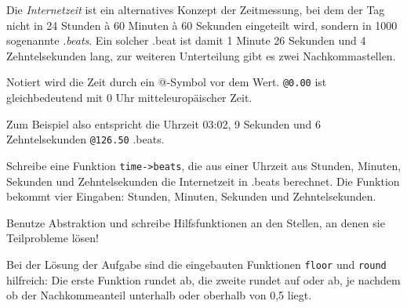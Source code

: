 \begin{aufgabe} Die \textit{Internetzeit} ist ein alternatives Konzept
  der Zeitmessung, bei dem der Tag nicht in 24 Stunden \`a 60 Minuten
  \`a 60 Sekunden eingeteilt wird, sondern in 1000 sogenannte
  \textit{.beats}.  Ein solcher .beat ist damit 1 Minute 26 Sekunden
  und 4 Zehntelsekunden lang, zur weiteren Unterteilung gibt es zwei
  Nachkommastellen.

  Notiert wird die Zeit durch ein @-Symbol vor dem Wert.
  \texttt{@0.00} ist gleichbedeutend mit 0 Uhr mitteleuropäischer Zeit.

  Zum Beispiel also entspricht die Uhrzeit 03:02, 9 Sekunden und 6
  Zehntelsekunden \texttt{@126.50} .beats.

  Schreibe eine Funktion \lstinline{time->beats}, die aus einer Uhrzeit
  aus Stunden, Minuten, Sekunden und Zehntelsekunden die Internetzeit
  in .beats berechnet.  Die Funktion bekommt vier Eingaben: Stunden,
  Minuten, Sekunden und Zehntelsekunden.

  Benutze Abstraktion und schreibe Hilfsfunktionen an den Stellen, an
  denen sie Teilprobleme lösen!

  Bei der Lösung der Aufgabe sind die eingebauten Funktionen
  \lstinline{floor} und \lstinline{round} hilfreich: Die erste
  Funktion rundet ab, die zweite rundet auf oder ab, je nachdem ob der
  Nachkommeanteil unterhalb oder oberhalb von 0,5 liegt.
\end{aufgabe}


